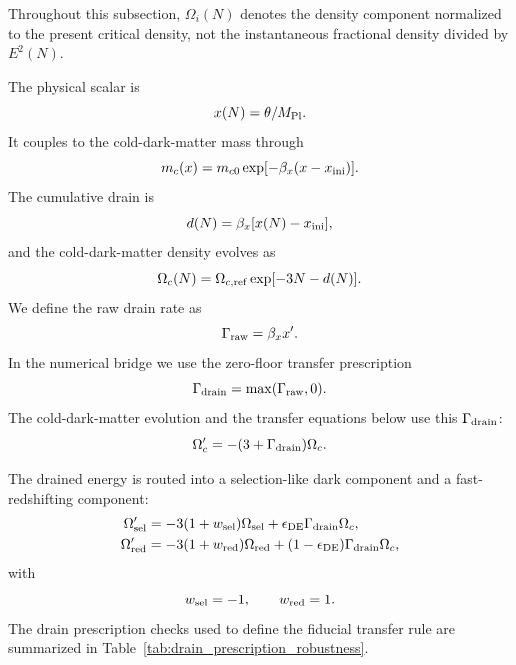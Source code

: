 ﻿\documentclass[11pt,prd,preprint,nofootinbib,amsmath,amssymb]{revtex4-2}
\begin{document}
Throughout this subsection, $\Omega_i(N)$ denotes the density component
normalized to the present critical density, not the instantaneous fractional
density divided by $E^2(N)$.

The physical scalar is
\begin{equation}
x(N)=\theta/M_{\rm Pl}.
\end{equation}
It couples to the cold-dark-matter mass through
\begin{equation}
m_c(x)=m_{c0}\exp[-\beta_x(x-x_{\rm ini})].
\label{eq:mass_coupling}
\end{equation}
The cumulative drain is
\begin{equation}
d(N)=\beta_x[x(N)-x_{\rm ini}],
\end{equation}
and the cold-dark-matter density evolves as
\begin{equation}
\Omega_c(N)
=
\Omega_{c,\rm ref}\exp[-3N-d(N)].
\end{equation}
We define the raw drain rate as
\begin{equation}
\Gamma_{\rm raw}=\beta_x x' .
\end{equation}
In the numerical bridge we use the zero-floor transfer prescription
\begin{equation}
\Gamma_{\rm drain}=\max(\Gamma_{\rm raw},0).
\end{equation}
The cold-dark-matter evolution and the transfer equations below use this
$\Gamma_{\rm drain}$:
\begin{equation}
\Omega_c'=-(3+\Gamma_{\rm drain})\Omega_c.
\label{eq:omega_c_drain}
\end{equation}

The drained energy is routed into a selection-like dark component and a fast-redshifting component:
\begin{align}
\Omega_{\rm sel}'
&=
-3(1+w_{\rm sel})\Omega_{\rm sel}
+\epsilon_{\rm DE}\Gamma_{\rm drain}\Omega_c,
\\
\Omega_{\rm red}'
&=
-3(1+w_{\rm red})\Omega_{\rm red}
+
(1-\epsilon_{\rm DE})\Gamma_{\rm drain}\Omega_c,
\end{align}
with
\begin{equation}
w_{\rm sel}=-1,
\qquad
w_{\rm red}=1.
\end{equation}
The drain prescription checks used to define the fiducial transfer rule are
summarized in Table~\ref{tab:drain_prescription_robustness}.
\end{document}
